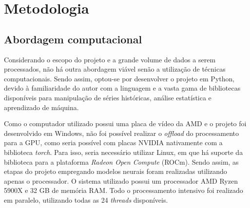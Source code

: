 \chapter{Metodologia}
\section{Abordagem computacional}

Considerando o escopo do projeto e a grande volume de dados a serem processados, não há outra abordagem viável senão
a utilização de técnicas computacionais. Sendo assim, optou-se por desenvolver o projeto em Python, devido à 
familiaridade do autor com a linguagem e a vasta gama de bibliotecas disponíveis para manipulação de séries históricas, 
análise estatística e aprendizado de máquina. 

Como o computador utilizado possui uma placa de vídeo da AMD e o projeto foi desenvolvido em Windows, não foi possível 
realizar o \textit{offload} do processamento para a GPU, como seria possível com placas NVIDIA nativamente com a 
biblioteca \textit{torch}. Para isso, seria necessário utilizar Linux, em que há suporte da biblioteca para 
a plataforma \textit{Radeon Open Compute} (ROCm). Sendo assim, as etapas do projeto empregando modelos neurais foram 
realizadas utilizando apenas o processador. O sistema utilizado possui um processador AMD Ryzen 5900X e 32 GB de memória
RAM. Todo o processamento intensivo foi realizado em paralelo, utilizando todas as 24 \textit{threads} disponíveis.

